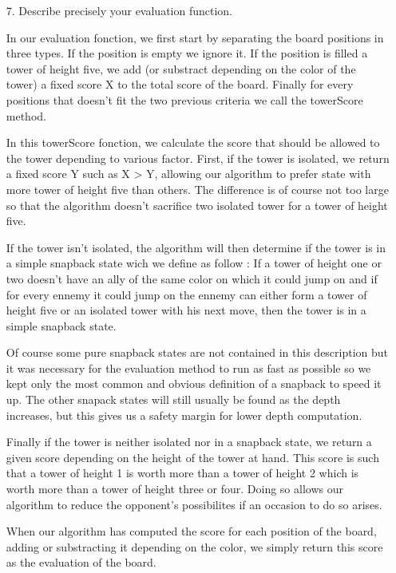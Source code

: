     \begin{enumerate}
        \item[7.] Describe precisely your evaluation function.
        \begin{framed}
            In our evaluation fonction, we first start by separating the board positions in three types. If the position is empty we ignore it. If the position is filled a tower of height five, we add (or substract depending on the color of the tower) a fixed score X to the total score of the board. Finally for every positions that doesn't fit the two previous criteria we call the towerScore method. \newline

            In this towerScore fonction, we calculate the score that should be allowed to the tower depending to various factor. First, if the tower is isolated, we return a fixed score Y such as X > Y, allowing our algorithm to prefer state with more tower of height five than others. The difference is of course not too large so that the algorithm doesn't sacrifice two isolated tower for a tower of height five. \newline

            If the tower isn't isolated, the algorithm will then determine if the tower is in a simple snapback state wich we define as follow : If a tower of height one or two doesn't have an ally of the same color on which it could jump on and if for every ennemy it could jump on the ennemy can either form a tower of height five or an isolated tower with his next move, then the tower is in a simple snapback state. \newline

            Of course some pure snapback states are not contained in this description but it was necessary for the evaluation method to run as fast as possible so we kept only the most common and obvious definition of a snapback to speed it up. The other snapack states will still usually be found as the depth increases, but this gives us a safety margin for lower depth computation. \newline

            Finally if the tower is neither isolated nor in a snapback state, we return a given score depending on the height of the tower at hand. This score is such that a tower of height 1 is worth more than a tower of height 2 which is worth more than a tower of height three or four. Doing so allows our algorithm to reduce the opponent's possibilites if an occasion to do so arises. \newline

            When our algorithm has computed the score for each position of the board, adding or substracting it depending on the color, we simply return this score as the evaluation of the board. \newline
        \end{framed}
    \end{enumerate}

